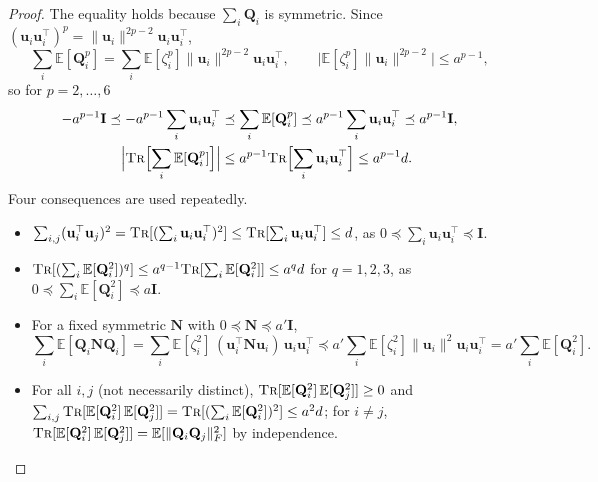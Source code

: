 \documentclass[11pt]{article}
\theoremstyle{remark}
\newcommand{\II}{\mathbf I}
\newcommand{\NN}{\mathbf N}
\newcommand{\QQ}{\mathbf Q}
\newcommand{\uu}{\mathbf u}
\newcommand{\Ex}{\mathbb E}
\newcommand{\norm}[1]{\lVert#1\rVert}
\newcommand{\tr}{\textsc{Tr}}
\begin{document}
\begin{proof}
The equality holds because $\sum_i\QQ_i$ is symmetric.
Since $(\uu_i\uu_i^{\top})^{p}=\norm{\uu_i}^{2p-2}\uu_i\uu_i^{\top}$,
\[
\sum_i\Ex[\QQ_i^{p}]=\sum_i\Ex[\zeta_i^{p}]\norm{\uu_i}^{2p-2}\uu_i\uu_i^{\top},
\qquad
\bigl|\Ex[\zeta_i^{p}]\norm{\uu_i}^{2p-2}\bigr|\le a^{p-1},
\]
so for $p=2,\dots,6$
\begin{align*}
-a^{p-1}\II\preceq-a^{p-1}\sum_i\uu_i\uu_i^{\top}
&\preceq\sum_i\Ex[\QQ_i^{p}]\preceq a^{p-1}\sum_i\uu_i\uu_i^{\top}\preceq a^{p-1}\II,\\
\Bigl|\tr\Bigl[\sum_i\Ex[\QQ_i^{p}]\Bigr]\Bigr|&\le a^{p-1}\tr\Bigl[\sum_i\uu_i\uu_i^{\top}\Bigr]\le a^{p-1}d .
\end{align*}
Four consequences are used repeatedly.
\begin{itemize}[leftmargin=*]
\item $\sum_{i,j}(\uu_i^{\top}\uu_j)^{2}=\tr[(\sum_i\uu_i\uu_i^{\top})^{2}]\le\tr[\sum_i\uu_i\uu_i^{\top}]\le d$,
as $0\preceq\sum_i\uu_i\uu_i^{\top}\preceq\II$.
\item $\tr[(\sum_i\Ex[\QQ_i^{2}])^{q}]\le a^{q-1}\tr[\sum_i\Ex[\QQ_i^{2}]]\le a^{q}d$
for $q=1,2,3$, as $0\preceq\sum_i\Ex[\QQ_i^{2}]\preceq a\II$.
\item For a fixed symmetric $\NN$ with $0\preceq\NN\preceq a'\II$,
\[
\sum_i\Ex[\QQ_i\NN\QQ_i]
=\sum_i\Ex[\zeta_i^{2}]\,(\uu_i^{\top}\NN\uu_i)\,\uu_i\uu_i^{\top}
\preceq a'\sum_i\Ex[\zeta_i^{2}]\norm{\uu_i}^{2}\uu_i\uu_i^{\top}
=a'\sum_i\Ex[\QQ_i^{2}] .
\]
\item For all $i,j$ (not necessarily distinct),
$\tr[\Ex[\QQ_i^{2}]\,\Ex[\QQ_j^{2}]]\ge0$ and
$\sum_{i,j}\tr[\Ex[\QQ_i^{2}]\,\Ex[\QQ_j^{2}]]=\tr[(\sum_i\Ex[\QQ_i^{2}])^{2}]\le a^{2}d$;
for $i\neq j$, $\tr[\Ex[\QQ_i^{2}]\,\Ex[\QQ_j^{2}]]=\Ex[\norm{\QQ_i\QQ_j}_F^{2}]$
by independence.
\end{itemize}


\end{proof}
\end{document}
